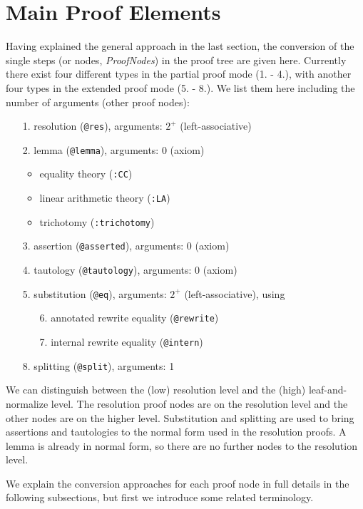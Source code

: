 \documentclass[10pt,a4paper]{article}
\newcommand{\ttt}{\texttt}
\begin{document}
\section{Main Proof Elements}\label{sec:mainelem}
Having explained the general approach in the last section, the conversion of the single steps (or nodes, \emph{ProofNodes}) in the proof tree are given here. Currently there exist four different types in the partial proof mode (1. - 4.), with another four types in the extended proof mode (5. - 8.). We list them here including the number of arguments (other proof nodes):
%
\begin{itemize}
	\item[1.] resolution (\ttt{@res}), arguments: $2^+$ (left-associative)
	\item[2.] lemma (\ttt{@lemma}), arguments: 0 (axiom)
	\begin{itemize}
		\item equality theory (\ttt{:CC})
		\item linear arithmetic theory (\ttt{:LA})
		\item trichotomy (\ttt{:trichotomy})
	\end{itemize}
	\item[3.] assertion (\ttt{@asserted}), arguments: 0 (axiom)
	\item[4.] tautology (\ttt{@tautology}), arguments: 0 (axiom)
	\item[5.] substitution (\ttt{@eq}), arguments: $2^+$ (left-associative), using 
	\begin{enumerate}
		\item[6.] annotated rewrite equality (\ttt{@rewrite})
		\item[7.] internal rewrite equality (\ttt{@intern})
	\end{enumerate}
	\item[8.] splitting (\ttt{@split}), arguments: 1
\end{itemize}
%
We can distinguish between the (low) resolution level and the (high) leaf-and-normalize level. The resolution proof nodes are on the resolution level and the other nodes are on the higher level. Substitution and splitting are used to bring assertions and tautologies to the normal form used in the resolution proofs. A lemma is already in normal form, so there are no further nodes to the resolution level.

We explain the conversion approaches for each proof node in full details in the following subsections, but first we introduce some related terminology.
\end{document}
